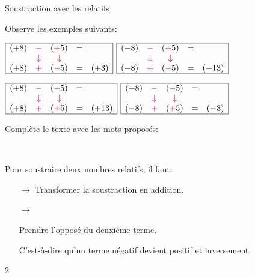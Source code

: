 \documentclass[a4paper,11pt]{report}
\begin{document}
\begin{resolu}{Soustraction avec les relatifs}{
Observe les exemples suivants:

\bigskip

$\begin{array}{|ccccc|}\hline
(+8)&{\color{magenta}-}&({\color{red}+}5)&= & \\
& {\color{magenta}\downarrow}&{\color{red}\downarrow} & & \\
(+8)&{\color{magenta}+}&({\color{red}-}5)&=&(+3)\\\hline
\end{array}$ 
\hfill 
$\begin{array}{|ccccc|}\hline
(-8)&{\color{magenta}-}&({\color{red}+}5)&= & \\
& {\color{magenta}\downarrow}&{\color{red}\downarrow} & & \\
(-8)&{\color{magenta}+}&({\color{red}-}5)&=&(-13)\\\hline
\end{array}$ 

\bigskip

$\begin{array}{|ccccc|}\hline
(+8)&{\color{magenta}-}&({\color{red}-}5)&= & \\
& {\color{magenta}\downarrow}&{\color{red}\downarrow} & & \\
(+8)&{\color{magenta}+}&({\color{red}+}5)&=&(+13)\\\hline
\end{array}$ 
\hfill 
$\begin{array}{|ccccc|}\hline
(-8)&{\color{magenta}-}&({\color{red}-}5)&= & \\
& {\color{magenta}\downarrow}&{\color{red}\downarrow} & & \\
(-8)&{\color{magenta}+}&({\color{red}+}5)&=&(-3)\\\hline
\end{array}$ 

\bigskip

Complète le texte avec les mots proposés:

\begin{center}
 $\quad$  $\quad$  $\quad$  $\quad$  
\end{center}

Pour soustraire deux nombres relatifs, il faut:\begin{itemize}
\item[{\color{magenta}$\rightarrow$}] {\color{magenta} Transformer la {\color{blue} soustraction} en {\color{blue} addition}.}
\item[{\color{red}$\rightarrow$}] {\color{red} Prendre l'opposé du {\color{blue} deuxième} terme.

C'est-à-dire qu'un terme {\color{blue} négatif} devient {\color{blue} positif} et inversement.}
\end{itemize}
}{2}
\end{resolu}
\end{document}

